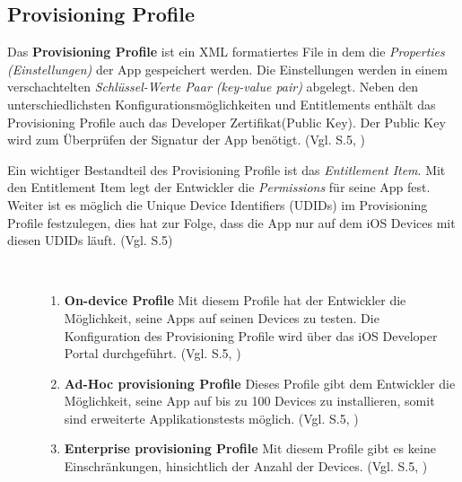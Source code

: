 \subsection{Provisioning Profile}
\label{sec:ProvisioningProfile}
Das \textbf{Provisioning Profile} ist ein XML formatiertes File in dem die \textit{\glqq Properties (Einstellungen)\grqq{}} der App gespeichert werden. Die Einstellungen werden in einem verschachtelten \textit{\glqq Schlüssel-Werte Paar (key-value pair)\grqq{}} abgelegt. Neben den unterschiedlichsten Konfigurationsmöglichkeiten und Entitlements enthält das Provisioning Profile auch das Developer Zertifikat(Public Key). Der Public Key wird zum Überprüfen der Signatur der App benötigt. (Vgl. \cite{iOSSec[5]} S.5, \cite{Hacking[1], ProvisioningProfile[1], ProvisioningProfile[2]}) \par
Ein wichtiger Bestandteil des Provisioning Profile ist das \textit{\glqq Entitlement Item\grqq{}}. Mit den Entitlement Item legt der Entwickler die \textit{\glqq Permissions\grqq{}} für seine App fest. Weiter ist es möglich die Unique Device Identifiers (UDIDs) im Provisioning Profile festzulegen, dies hat zur Folge, dass die App nur auf dem iOS Devices mit diesen UDIDs läuft. (Vgl. \cite{iOSSec[5]} S.5) \par 

\begin{description}
    \item[\parbox{\textwidth} {Es gibt drei unterschiedliche Arten von Provisioning Profiles }]~\par
    \begin{enumerate}
        \item \textbf{On-device Profile} \newline
Mit diesem Profile hat der Entwickler die Möglichkeit, seine Apps auf seinen Devices zu testen. Die Konfiguration des Provisioning Profile wird über das iOS Developer Portal durchgeführt. (Vgl. \cite{iOSSec[5]} S.5, \cite{AppDist[1]})
    
        \item \textbf{Ad-Hoc provisioning Profile} \newline
Dieses Profile gibt dem Entwickler die Möglichkeit, seine App auf bis zu 100 Devices zu installieren, somit sind erweiterte Applikationstests möglich. (Vgl. \cite{iOSSec[5]} S.5, \cite{AppDist[1]})
    
        \item \textbf{Enterprise provisioning Profile} \newline
Mit diesem Profile gibt es keine Einschränkungen, hinsichtlich der Anzahl der Devices. (Vgl. \cite{iOSSec[5]} S.5, \cite{AppDist[1]})
    \end{enumerate}
\end{description} 


